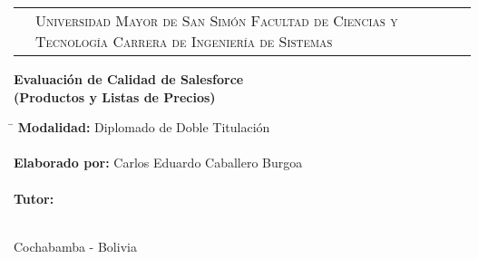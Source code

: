 \newcommand{\umsslogo}{
\adjustbox{valign=t}{}
}
\newcommand{\fcytlogo}{
\adjustbox{valign=t}{}
}

\begin{titlepage}

\begin{tabular}[t]{c p{8.6cm} c}
\umsslogo &
\vfill
\large{\textsc{Universidad Mayor de San Simón}} \newline
\large{\textsc{Facultad de Ciencias y Tecnología}} \newline
\large{\textsc{Carrera de Ingeniería de Sistemas}} &
\fcytlogo \\
\end{tabular}
\vfill
\begin{center}
\huge{\bf{Evaluación de Calidad de Salesforce\\
(Productos y Listas de Precios)}}
\end{center}
\vfill
\begin{tabbing}
\hspace{4cm}\=\+
\textbf{Modalidad:} Diplomado de Doble Titulación\\
\\
\textbf{Elaborado por:} Carlos Eduardo Caballero Burgoa\\
\\
\textbf{Tutor:} \\
\\
\end{tabbing}
\begin{center}
Cochabamba - Bolivia
\end{center}
\end{titlepage}

